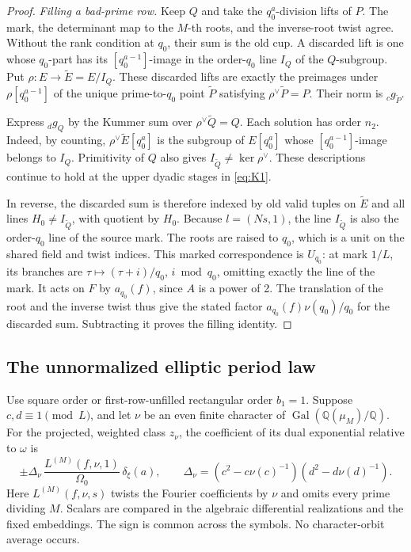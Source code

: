 \begin{proof}
\emph{Filling a bad-prime row.}
Keep \(Q\) and take the \(q_0^a\)-division lifts of \(P\).  The mark,
the determinant map to the \(M\)-th roots, and the inverse-root twist
agree.  Without the rank condition at \(q_0\), their sum is the old cup.
A discarded lift is one whose \(q_0\)-part has its
\([q_0^{a-1}]\)-image in the order-\(q_0\) line \(I_Q\) of the
\(Q\)-subgroup.  Put \(\rho:E\to\widetilde E=E/I_Q\).
These discarded lifts are exactly the preimages under
\(\rho[q_0^{a-1}]\) of the unique prime-to-\(q_0\) point
\(\widetilde P\) satisfying \(\rho^\vee\widetilde P=P\).
Their norm is \({}_c g_{\widetilde P}\).

Express \({}_d g_Q\) by the Kummer sum over
\(\rho^\vee\widetilde Q=Q\).  Each solution has order \(n_2\).
Indeed, by counting,
\(\rho^\vee\widetilde E[q_0^a]\) is the subgroup of
\(E[q_0^a]\) whose \([q_0^{a-1}]\)-image belongs to \(I_Q\).
Primitivity of \(Q\) also gives
\(I_{\widetilde Q}\ne\ker\rho^\vee\).
These descriptions continue to hold at the upper dyadic stages in
\eqref{eq:K1}.

In reverse, the discarded sum is therefore indexed by old valid tuples
on \(\widetilde E\) and all lines \(H_0\ne I_{\widetilde Q}\), with
quotient by \(H_0\).  Because \(l=(Ns,1)\), the line
\(I_{\widetilde Q}\) is also the order-\(q_0\) line of the source mark.
The roots are raised to \(q_0\), which is a unit on the shared field
and twist indices.  This marked correspondence is \(U_{q_0}\):
at mark \(1/L\), its branches are
\(\tau\mapsto(\tau+i)/q_0\), \(i\bmod q_0\), omitting exactly the
line of the mark.  It acts on \(F\) by \(a_{q_0}(f)\), since \(A\)
is a power of 2.  The translation of the root and the inverse twist
thus give the stated factor \(a_{q_0}(f)\nu(q_0)/q_0\) for the
discarded sum.  Subtracting it proves the filling identity.
\end{proof}

\subsection{The unnormalized elliptic period law}

\begin{proposition}\label{prop:siegel-period}
Use square order or first-row-unfilled rectangular order \(b_1=1\).
Suppose \(c,d\equiv1\pmod L\), and let \(\nu\) be an even finite
character of \(\operatorname{Gal}(\mathbb Q(\mu_M)/\mathbb Q)\).
For the projected, weighted class \(z_\nu\), the coefficient of its
dual exponential relative to \(\omega\) is
\[
 \pm\Delta_\nu\,
       \frac{L^{(M)}(f,\nu,1)}{\Omega_0}\,\delta_\xi(a),
 \qquad
 \Delta_\nu=(c^2-c\nu(c)^{-1})(d^2-d\nu(d)^{-1}).
                                                        \tag{K4}\label{eq:K4}
\]
Here \(L^{(M)}(f,\nu,s)\) twists the Fourier coefficients by \(\nu\)
and omits every prime dividing \(M\).  Scalars are compared in the
algebraic differential realizations and the fixed embeddings.  The
sign is common across the symbols.  No character-orbit average occurs.
\end{proposition}


